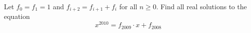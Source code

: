 Let $f_0=f_1=1$ and $f_{i+2}=f_{i+1}+f_i$ for all $n\ge 0$. Find all real solutions to the equation\[x^{2010}=f_{2009}\cdot x+f_{2008}\]